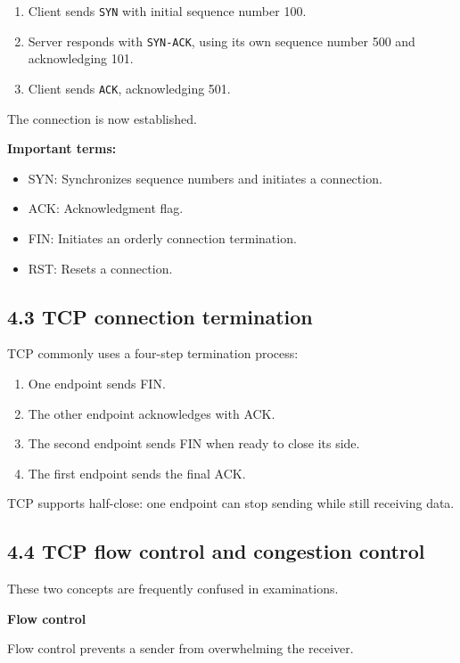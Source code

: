 \begin{enumerate}
    \item Client sends \texttt{SYN} with initial sequence number 100.
    \item Server responds with \texttt{SYN-ACK}, using its own sequence number 500 and acknowledging 101.
    \item Client sends \texttt{ACK}, acknowledging 501.
\end{enumerate}

The connection is now established.

\textbf{Important terms:}

\begin{itemize}
    \item SYN: Synchronizes sequence numbers and initiates a connection.
    \item ACK: Acknowledgment flag.
    \item FIN: Initiates an orderly connection termination.
    \item RST: Resets a connection.
\end{itemize}

\subsection{4.3 TCP connection termination}

TCP commonly uses a four-step termination process:

\begin{enumerate}
    \item One endpoint sends FIN.
    \item The other endpoint acknowledges with ACK.
    \item The second endpoint sends FIN when ready to close its side.
    \item The first endpoint sends the final ACK.
\end{enumerate}

TCP supports half-close: one endpoint can stop sending while still receiving data.

\subsection{4.4 TCP flow control and congestion control}

These two concepts are frequently confused in examinations.

\textbf{Flow control}

Flow control prevents a sender from overwhelming the receiver.

